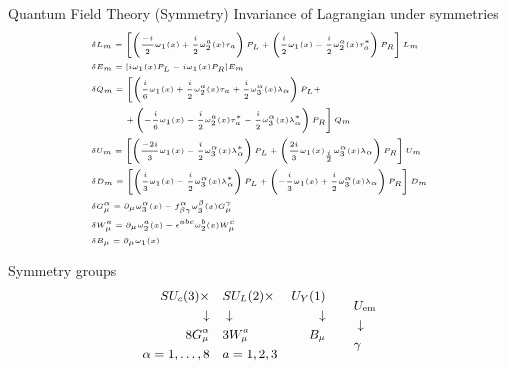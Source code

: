 \documentclass{beamer}
\begin{document}
\begin{frame}{Quantum Field Theory (Symmetry)}
Invariance of Lagrangian under symmetries
	\begin{equation*}
{\tiny		\begin{aligned}
			& \delta L_m = \left[ \left( \frac{-i}{2} \omega_1(x) + \frac{i}{2} \omega_2^a(x) \tau_a \right) P_L + \left( \frac{i}{2} \omega_1(x) - \frac{i}{2} \omega_2^a(x) \tau^*_a \right) P_R \right] L_m \\
			& \delta E_m = [ i\omega_1(x) P_L - i \omega_1(x) P_R ] E_m \\
			& \delta Q_m = \left[ \left( \frac{i}{6} \omega_1(x) + \frac{i}{2} \omega_2^a(x) \tau_a + \frac{i}{2} \omega_3^{\alpha}(x) \lambda_{\alpha} \right) P_L +  \right. \\
			& \phantom{\delta Q_m =} \left. + \left( -\frac{i}{6} \omega_1(x) - \frac{i}{2} \omega_2^a(x) \tau^*_a - \frac{i}{2} \omega_3^{\alpha}(x) \lambda_{\alpha}^* \right) P_R \right] Q_m \\
			& \delta U_m = \left[ \left( \frac{-2i}{3} \omega_1(x) - \frac{i}{2} \omega_3^{\alpha}(x) \lambda_{\alpha}^* \right) P_L + \left( \frac{2i}{3} \omega_1(x) _ \frac{i}{2} \omega_3^{\alpha}(x) \lambda_{\alpha} \right) P_R \right] U_m \\
			& \delta D_m = \left[ \left( \frac{i}{3} \omega_1(x) - \frac{i}{2} \omega_3^{\alpha}(x) \lambda_{\alpha}^* \right) P_L + \left( -\frac{i}{3} \omega_1(x) + \frac{i}{2} \omega_3^{\alpha}(x) \lambda_{\alpha} \right) P_R \right] D_m \\
			& \delta G_{\mu}^{\alpha} = \partial_{\mu} \omega_3^{\alpha}(x) - f^{\alpha}_{\beta \gamma} \omega_3^{\beta}(x) G_{\mu}^{\gamma} \\
			& \delta W_{\mu}^a = \partial_{\mu} \omega_2^a(x) - \epsilon^{abc} \omega_2^b(x) W_{\mu}^c \\
			& \delta B_{\mu} = \partial_{\mu} \omega_1(x)
		\end{aligned} }
	\end{equation*}

		Symmetry groups
		\begin{equation*}
{\small 			\begin{aligned}
				 SU_c(3) \times \quad & SU_L(2)  \times & U_Y(1) \\
				 \downarrow \quad & \downarrow & \downarrow \\
				 8 G_{\mu}^{\alpha} \quad & 3 W_{\mu}^a & B_{\mu} \\
				 \alpha = 1, \dots, 8 \quad & a = 1, 2, 3 & \\
			\end{aligned} \quad \quad \, \begin{aligned}
& U_{\text{em}} \\ 
& \downarrow \\
& \gamma
\end{aligned} }
		\end{equation*}

\end{frame}
\end{document}
